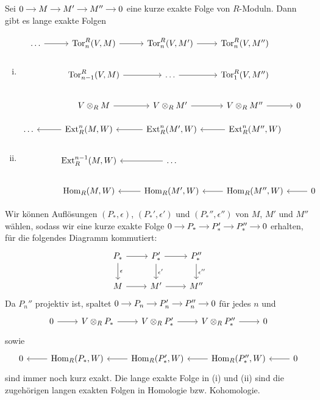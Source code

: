 \begin{satz}
	Sei 
	\(
		\begin{tikzcd}[cramped,sep=small]
			0 \rar & M \rar & M' \rar & M'' \rar & 0
		\end{tikzcd}
	\)
	eine kurze exakte Folge von $R$-Moduln.
	Dann gibt es lange exakte Folgen 
	\begin{enumerate}[(i)]
		\item \[
			\begin{tikzcd}
				\ldots \rar & \Tor^R_n(V,M) \rar & \Tor^R_n(V,M') \rar & \Tor_n^R(V,M'') & \\
				&\Tor^R_{n-1}(V,M) \rar & \ldots \rar & \Tor_1^R(V,M'') \\
				&V \otimes_R M \rar & V \otimes_R M' \rar & V \otimes_R M'' \rar & 0 
			\end{tikzcd}
		\]
		\item \[
			\begin{tikzcd}
				\ldots & \Ext_R^n(M,W) \lar & \Ext^n_R(M',W) \lar & \Ext_R^n(M'',W) \lar \\
				&\Ext_R^{n-1}(M,W) & \lar \ldots \\
				&\Hom_R(M,W) & \Hom_R(M',W) \lar & \Hom_R(M'',W) \lar & 0 \lar
			\end{tikzcd}
		\]
	\end{enumerate}
\end{satz}
\begin{beweis}
	Wir können Auflösungen $(P_*,\epsilon)$, $(P_*',\epsilon')$ und $(P_*'',\epsilon'')$ von $M$, $M'$ und $M''$ wählen, sodass wir eine kurze exakte Folge
	\(
		\begin{tikzcd}[cramped,sep=small]
			0 \rar & P_* \rar & P_*' \rar & P_*'' \rar & 0
		\end{tikzcd}
	\)
	erhalten, für die folgendes Diagramm kommutiert: 
	\[
		\begin{tikzcd}
			P_* \rar \dar["\epsilon"] & P_*' \dar["\epsilon'"] \rar & P_*'' \dar["\epsilon''"] \\
			M \rar & M' \rar & M''
		\end{tikzcd}
	\]
	Da $P_n''$ projektiv ist, spaltet 
	\(
		\begin{tikzcd}[cramped,sep=small]
			0 \rar & P_n \rar & P_n' \rar & P_n'' \rar & 0
		\end{tikzcd}
	\)
	für jedes $n$ und
	\[
		\begin{tikzcd}
			0 \rar & V \otimes_R P_* \rar & V \otimes_R P_*' \rar & V \otimes_R P_*'' \rar &0
		\end{tikzcd}
	\]
	sowie
	\[
		\begin{tikzcd}
			0 & \Hom_R(P_*,W) \lar & \Hom_R(P_*',W) \lar & \Hom_R(P_*'',W) \lar & 0 \lar
		\end{tikzcd}
	\]
	sind immer noch kurz exakt. 
	Die lange exakte Folge in (i) und (ii) sind die zugehörigen langen exakten Folgen in Homologie bzw. Kohomologie.
\end{beweis}


